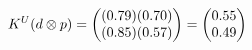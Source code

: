 \documentclass[preview]{standalone}
\begin{document}
\begin{align*}
\special{dvisvgm:raw <g id='unique000'>}K^U(d \otimes p) = \begin{pmatrix} (0.79)(0.70) \\ (0.85)(0.57) \end{pmatrix} = \begin{pmatrix} 0.55 \\ 0.49 \end{pmatrix}\special{dvisvgm:raw </g>}
\end{align*}
\end{document}
